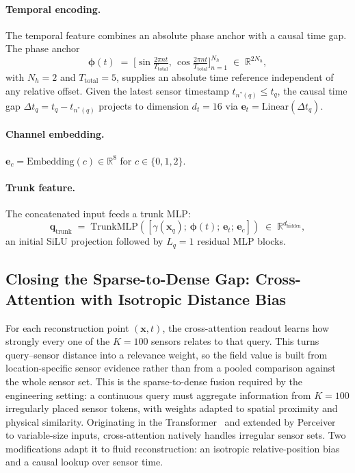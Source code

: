 \paragraph{Temporal encoding.}
The temporal feature combines an absolute phase anchor with a causal time gap. The phase anchor
\begin{equation*}
    \boldsymbol{\phi}(t) \;=\; \big[\sin\!\tfrac{2\pi n t}{T_{\text{total}}},\,\cos\!\tfrac{2\pi n t}{T_{\text{total}}}\big]_{n=1}^{N_h}\;\in\;\mathbb{R}^{2N_h},
\end{equation*}
with $N_h = 2$ and $T_{\text{total}} = 5$, supplies an absolute time reference independent of any relative offset. Given the latest sensor timestamp $t_{n^*(q)} \le t_q$, the causal time gap $\Delta t_q = t_q - t_{n^*(q)}$ projects to dimension $d_t = 16$ via $\mathbf{e}_t = \mathrm{Linear}(\Delta t_q)$.

\paragraph{Channel embedding.}
$\mathbf{e}_c = \mathrm{Embedding}(c) \in \mathbb{R}^8$ for $c\in\{0,1,2\}$.

\paragraph{Trunk feature.}
The concatenated input feeds a trunk MLP:
\begin{equation*}
    \mathbf{q}_{\text{trunk}} \;=\; \mathrm{TrunkMLP}([\gamma(\mathbf{x}_q);\,\boldsymbol{\phi}(t);\,\mathbf{e}_t;\,\mathbf{e}_c]) \;\in\;\mathbb{R}^{d_{\text{hidden}}},
\end{equation*}
an initial SiLU projection followed by $L_q = 1$ residual MLP blocks.

\subsection{Closing the Sparse-to-Dense Gap: Cross-Attention with Isotropic Distance Bias}
\label{subsec:cross_attn}

For each reconstruction point $(\mathbf{x}, t)$, the cross-attention readout learns how strongly every one of the $K=100$ sensors relates to that query. This turns query--sensor distance into a relevance weight, so the field value is built from location-specific sensor evidence rather than from a pooled comparison against the whole sensor set. This is the sparse-to-dense fusion required by the engineering setting: a continuous query must aggregate information from $K=100$ irregularly placed sensor tokens, with weights adapted to spatial proximity and physical similarity. Originating in the Transformer~\cite{Vaswani2017Attention} and extended by Perceiver~\cite{Jaegle2021Perceiver} to variable-size inputs, cross-attention natively handles irregular sensor sets. Two modifications adapt it to fluid reconstruction: an isotropic relative-position bias and a causal lookup over sensor time.

